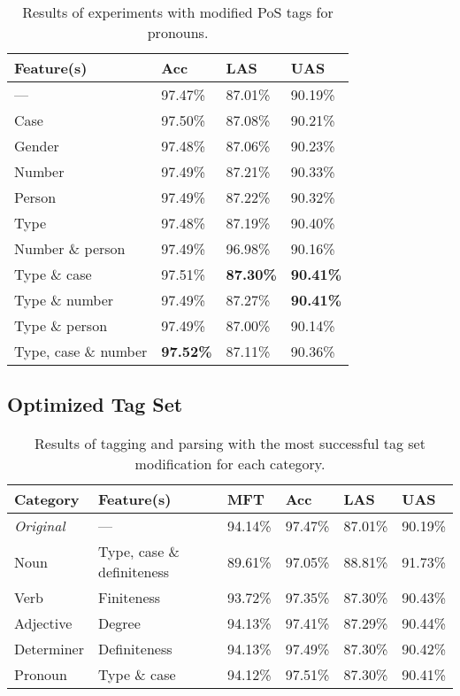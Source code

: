 \documentclass[11pt,a4paper]{article}
\begin{document}
\begin{table}
    \centering
    \smaller[0.5]
    \begin{tabular}{@{}llll@{}}
        \toprule
        \textbf{Feature(s)} & \textbf{Acc} & \textbf{LAS} & \textbf{UAS} \\
        \midrule
        --- & 97.47\% & 87.01\% & 90.19\% \\
        Case & 97.50\% & 87.08\% & 90.21\% \\
        Gender & 97.48\% & 87.06\% & 90.23\% \\
        Number & 97.49\% & 87.21\% & 90.33\% \\
        Person & 97.49\% & 87.22\% & 90.32\% \\
        Type & 97.48\% & 87.19\% & 90.40\% \\
        Number \& person & 97.49\% & 96.98\% & 90.16\% \\
        Type \& case & 97.51\% & \textbf{87.30\%} & \textbf{90.41\%} \\
        Type \& number & 97.49\% & 87.27\% & \textbf{90.41\%} \\
        Type \& person & 97.49\% & 87.00\% & 90.14\% \\
        Type, case \& number & \textbf{97.52\%} & 87.11\% & 90.36\% \\
        \bottomrule
    \end{tabular}
    \caption{Results of experiments with modified PoS tags for pronouns.}
    \label{pronresults}
\end{table}

\subsection{Optimized Tag Set}
\begin{table*}[ht]
    \centering
    \smaller[0.5]
    \begin{tabular}{@{}llllll@{}}
        \toprule
        \textbf{Category} & \textbf{Feature(s)} & \textbf{MFT} &
        \textbf{Acc} & \textbf{LAS} & \textbf{UAS} \\
        \midrule
        \emph{Original} & --- & 94.14\% & 97.47\% & 87.01\% & 90.19\% \\
        Noun & Type, case \& definiteness & 89.61\% & 97.05\% & 88.81\% &
        91.73\% \\
        Verb & Finiteness & 93.72\% & 97.35\% & 87.30\% & 90.43\% \\
        Adjective & Degree & 94.13\% & 97.41\% & 87.29\% & 90.44\% \\
        Determiner & Definiteness & 94.13\% & 97.49\% & 87.30\% & 90.42\% \\
        Pronoun & Type \& case & 94.12\% & 97.51\% & 87.30\% & 90.41\% \\
        \bottomrule
    \end{tabular}
    \caption{Results of tagging and parsing with the most successful tag set
        modification for each category.}
    \label{respectiveresults}
\end{table*}
\end{document}
